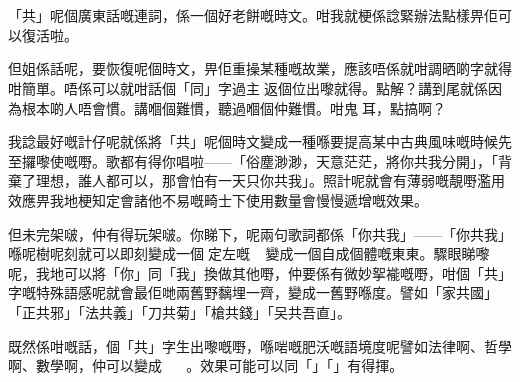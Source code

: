 \chapter{}

「共」呢個廣東話嘅連詞，係一個好老餅嘅時文。咁我就梗係諗緊辦法點樣畀佢可以復活啦。

但姐係話呢，要恢復呢個時文，畀佢重操某種嘅故業，應該唔係就咁調晒啲字就得咁簡單。唔係可以就咁話個「同」字過主返個位出嚟就得。點解？講到尾就係因為根本啲人唔會慣。講嗰個難慣，聽過嗰個仲難慣。咁鬼󱱹耳，點搞啊？

我諗最好嘅計仔呢就係將「共」呢個時文變成一種喺要提高某中古典風味嘅時候先至攞嚟使嘅嘢。歌都有得你唱啦——「俗塵渺渺，天意茫茫，將你共我分開」，「背棄了理想，誰人都可以，那會怕有一天只你共我」。照計呢就會有薄弱嘅靚嘢濫用效應畀我地梗知定會諸他不易嘅畸士下使用數量會慢慢遞增嘅效果。

但未完架啵，仲有得玩架啵。你睇下，呢兩句歌詞都係「你共我」——「你共我」喺呢樹呢刻就可以即刻變成一個定左嘅，變成一個自成個體嘅東東。驟眼睇嚟呢，我地可以將「你」同「我」換做其他嘢，仲要係有微妙挐褦嘅嘢，咁個「共」字嘅特殊語感呢就會最佢哋兩舊野黐埋一齊，變成一舊野喺度。譬如「家共國」「正共邪」「法共義」「刀共菊」「槍共錢」「㕦共吾直」。

既然係咁嘅話，個「共」字生出嚟嘅嘢，喺啱嘅肥沃嘅語境度呢譬如法律啊、哲學啊、數學啊，仲可以變成 。效果可能可以同「」「」有得揮。







